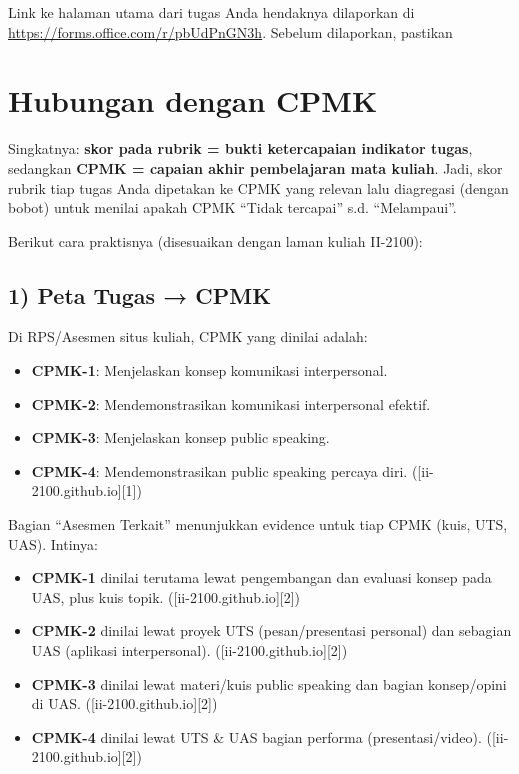 \documentclass[
  letterpaper,
  DIV=11,
  numbers=noendperiod]{scrreprt}
\providecommand{\tightlist}{%
  \setlength{\itemsep}{0pt}\setlength{\parskip}{0pt}}
\begin{document}
Link ke halaman utama dari tugas Anda hendaknya dilaporkan di
\url{https://forms.office.com/r/pbUdPnGN3h}. Sebelum dilaporkan,
pastikan

\section*{Hubungan dengan CPMK}\label{hubungan-dengan-cpmk}


Singkatnya: \textbf{skor pada rubrik = bukti ketercapaian indikator
tugas}, sedangkan \textbf{CPMK = capaian akhir pembelajaran mata
kuliah}. Jadi, skor rubrik tiap tugas Anda dipetakan ke CPMK yang
relevan lalu diagregasi (dengan bobot) untuk menilai apakah CPMK ``Tidak
tercapai'' s.d. ``Melampaui''.

Berikut cara praktisnya (disesuaikan dengan laman kuliah II-2100):

\subsection*{1) Peta Tugas → CPMK}\label{peta-tugas-cpmk}

Di RPS/Asesmen situs kuliah, CPMK yang dinilai adalah:

\begin{itemize}
\tightlist
\item
  \textbf{CPMK-1}: Menjelaskan konsep komunikasi interpersonal.
\item
  \textbf{CPMK-2}: Mendemonstrasikan komunikasi interpersonal efektif.
\item
  \textbf{CPMK-3}: Menjelaskan konsep public speaking.
\item
  \textbf{CPMK-4}: Mendemonstrasikan public speaking percaya diri.
  ({[}ii-2100.github.io{]}{[}1{]})
\end{itemize}

Bagian ``Asesmen Terkait'' menunjukkan evidence untuk tiap CPMK (kuis,
UTS, UAS). Intinya:

\begin{itemize}
\tightlist
\item
  \textbf{CPMK-1} dinilai terutama lewat pengembangan dan evaluasi
  konsep pada UAS, plus kuis topik. ({[}ii-2100.github.io{]}{[}2{]})
\item
  \textbf{CPMK-2} dinilai lewat proyek UTS (pesan/presentasi personal)
  dan sebagian UAS (aplikasi interpersonal).
  ({[}ii-2100.github.io{]}{[}2{]})
\item
  \textbf{CPMK-3} dinilai lewat materi/kuis public speaking dan bagian
  konsep/opini di UAS. ({[}ii-2100.github.io{]}{[}2{]})
\item
  \textbf{CPMK-4} dinilai lewat UTS \& UAS bagian performa
  (presentasi/video). ({[}ii-2100.github.io{]}{[}2{]})
\end{itemize}
\end{document}

